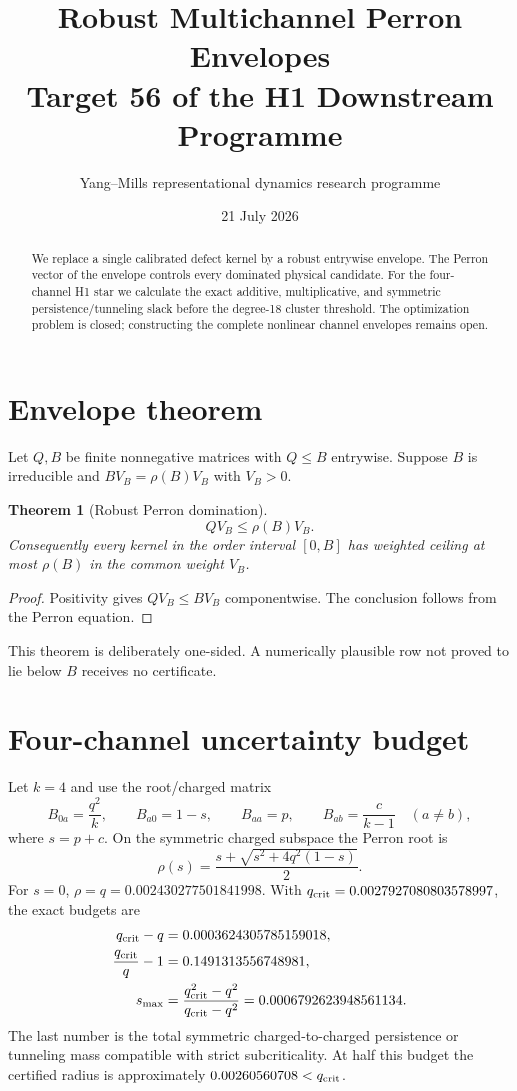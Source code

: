 \documentclass[11pt]{article}
\title{Robust Multichannel Perron Envelopes\\Target 56 of the H1 Downstream Programme}
\author{Yang--Mills representational dynamics research programme}
\date{21 July 2026}
\newtheorem{theorem}{Theorem}
\begin{document}
\maketitle
\begin{abstract}
We replace a single calibrated defect kernel by a robust entrywise envelope.
The Perron vector of the envelope controls every dominated physical candidate.
For the four-channel H1 star we calculate the exact additive, multiplicative,
and symmetric persistence/tunneling slack before the degree-18 cluster
threshold.  The optimization problem is closed; constructing the complete
nonlinear channel envelopes remains open.
\end{abstract}

\section{Envelope theorem}
Let $Q,B$ be finite nonnegative matrices with $Q\leq B$ entrywise.  Suppose
$B$ is irreducible and $BV_B=\rho(B)V_B$ with $V_B>0$.
\begin{theorem}[Robust Perron domination]
\[
 QV_B\leq \rho(B)V_B.
\]
Consequently every kernel in the order interval $[0,B]$ has weighted ceiling
at most $\rho(B)$ in the common weight $V_B$.
\end{theorem}
\begin{proof}
Positivity gives $QV_B\leq BV_B$ componentwise.  The conclusion follows from
the Perron equation.
\end{proof}

This theorem is deliberately one-sided.  A numerically plausible row not
proved to lie below $B$ receives no certificate.

\section{Four-channel uncertainty budget}
Let $k=4$ and use the root/charged matrix
\[
 B_{0a}=\frac{q^2}{k},\qquad B_{a0}=1-s,\qquad
 B_{aa}=p,\qquad B_{ab}=\frac{c}{k-1}\quad(a\neq b),
\]
where $s=p+c$.  On the symmetric charged subspace the Perron root is
\begin{equation}\label{eq:rho}
 \rho(s)=\frac{s+\sqrt{s^2+4q^2(1-s)}}2.
\end{equation}
For $s=0$, $\rho=q=0.002430277501841998$.  With
$q_{\rm crit}=0.0027927080803578997$, the exact budgets are
\begin{align*}
 q_{\rm crit}-q&=0.0003624305785159018,\\
 \frac{q_{\rm crit}}q-1&=0.1491313556748981,\\
 s_{\max}&=\frac{q_{\rm crit}^2-q^2}{q_{\rm crit}-q^2}
 =0.0006792623948561134.
\end{align*}
The last number is the total symmetric charged-to-charged persistence or
tunneling mass compatible with strict subcriticality.  At half this budget the
certified radius is approximately $0.00260560708<q_{\rm crit}$.
\end{document}
